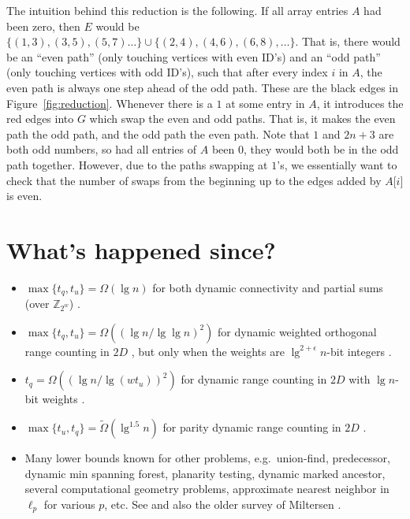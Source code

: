 \documentclass[11pt]{article}
\begin{document}
The intuition behind this reduction is the following. If all array entries $A$ had been zero, then $E$ would be $\{(1, 3), (3, 5), (5, 7) \ldots\} \cup \{(2, 4), (4, 6), (6, 8), \ldots \}$. That is, there would be an ``even path'' (only touching vertices with even ID's) and an ``odd path'' (only touching vertices with odd ID's), such that after every index $i$ in $A$, the even path is always one step ahead of the odd path. These are the black edges in Figure~\ref{fig:reduction}. Whenever there is a $1$ at some entry in $A$, it introduces the red edges into $G$ which swap the even and odd paths. That is, it makes the even path the odd path, and the odd path the even path. Note that $1$ and $2n+3$ are both odd numbers, so had all entries of $A$ been $0$, they would both be in the odd path together. However, due to the paths swapping at $1$'s, we essentially want to check that the number of swaps from the beginning up to the edges added by $A\text{[}i\text{]}$ is even.

\section{What's happened since?}
\begin{itemize}
\item $\max\{t_q, t_u\} = \Omega(\lg n)$ for both dynamic connectivity and partial sums (over $\mathbb Z_{2^w}$) \cite{PatrascuD04}.
\item $\max\{t_q, t_u\} = \Omega((\lg n/\lg\lg n)^2)$ for dynamic weighted orthogonal range counting in $2D$ , but only when the weights are $\lg^{2+\epsilon} n$-bit integers \cite{Patrascu07}.
\item $t_q = \Omega((\lg n / \lg(w t_u))^2)$ for dynamic range counting in $2D$ with $\lg n$-bit weights \cite{Larsen12}.
\item $\max\{t_u, t_q\} = \tilde{\Omega}(\lg^{1.5} n)$ for parity dynamic range counting in $2D$ \cite{LarsenWY17}.
\item Many lower bounds known for other problems, e.g.\ union-find, predecessor, dynamic min spanning forest, planarity testing, dynamic marked ancestor, several computational geometry problems, approximate nearest neighbor in $\ell_p$ for various $p$, etc. See \cite{Patrascu11} and also the older survey of Miltersen \cite{Miltersen99}.
\end{itemize}

\newcommand{\etalchar}[1]{$^{#1}$}
\end{document}
